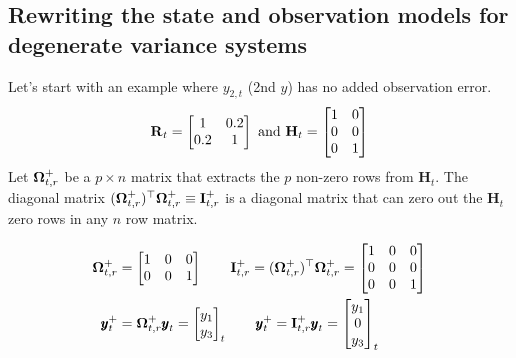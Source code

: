 \documentclass[]{article}
\def\OMG{\mbox{\boldmath $\Omega$}}
\def\HH{\mbox{$\mathbf H$}}	\def\hh{\mbox{$\mathbf h$}}
\def\II{\mbox{$\mathbf I$}} \def\ii{\mbox{$\mathbf i$}}
\def\RR{\mbox{$\mathbf R$}}	 \def\rr{\mbox{$\mathbf r$}} \def\Rb{\mbox{$\mathbf H$}}	\def\Rm{\mathbb{R}}
\begin{document}
\subsection{Rewriting the state and observation models for degenerate variance systems}
Let's start with an example where $y_{2,t}$ (2nd $y$) has no added observation error.
\begin{equation}
\RR_t=\begin{bmatrix}
1&0.2\\
0.2&1
\end{bmatrix}\\
\text{  and  }
\HH_t=\begin{bmatrix}
1&0\\
0&0\\
0&1
\end{bmatrix}
\end{equation}
Let $\OMG_{t,r}^+$ be a $p \times n$  matrix that extracts the $p$ non-zero rows from $\HH_t$. The diagonal matrix $(\OMG_{t,r}^+)^\top\OMG_{t,r}^+ \equiv \II_{t,r}^+$ is a diagonal matrix that can zero out the $\HH_t$ zero rows in any $n$ row matrix.   

\begin{equation}
\begin{split}
\OMG_{t,r}^+ &= 
\begin{bmatrix}
1&0&0\\
0&0&1
\end{bmatrix}\quad\quad
\II_{t,r}^+ = (\OMG_{t,r}^+)^\top\OMG_{t,r}^+ = 
\begin{bmatrix}
1&0&0\\
0&0&0\\
0&0&1
\end{bmatrix}
\\
\yy_t^+&=\OMG_{t,r}^+ \yy_t = 
\begin{bmatrix}
y_1\\
y_3
\end{bmatrix}_t\quad\quad
\yy_t^+=\II_{t,r}^+ \yy_t = \begin{bmatrix}
y_1\\
0\\
y_3
\end{bmatrix}_t
\end{split}
\end{equation}
\end{document}
